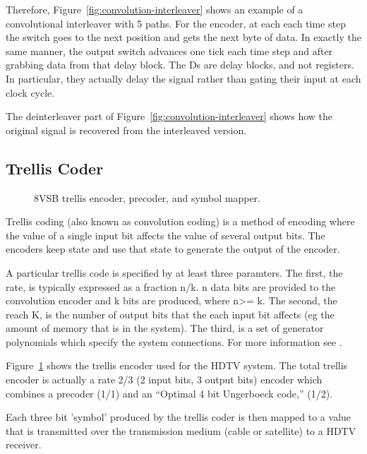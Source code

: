 \documentclass{article}
\begin{document}
Therefore, Figure~\ref{fig:convolution-interleaver} shows an example of a convolutional
interleaver with 5 paths. For the encoder, at each each time step the switch goes to the
next position and gets the next byte of data. In exactly the same manner, the output
switch advances one tick each time step and after grabbing data from that delay block.
The Ds are delay blocks, and not registers. In particular, they actually delay the signal
rather than gating their input at each clock cycle.

The deinterleaver part of Figure~\ref{fig:convolution-interleaver} shows how the 
original signal is recovered from the interleaved version. 





\subsection{Trellis Coder}
\begin{figure}
\center
\epsfxsize=5.5in
\caption{8VSB trellis encoder, precoder, and symbol mapper.}
\label{fig:trellis-system}
\end{figure}

Trellis coding (also known as convolution coding) 
is a method of encoding where the value of a single input 
bit affects the value of several output bits. The encoders
keep state and use that state to generate the output of the 
encoder. 

A particular trellis code is 
specified by at least three paramters. The first, the rate, is typically expressed as
a fraction n/k. n data bits are provided to the convolution encoder and k bits are produced,
where n>= k. The second, the reach K, is the number of output bits that the
each input bit affects (eg the amount of memory that is in the system). 
The third, is a set of generator polynomials which specify the system connections.
For more information see \cite{fleming:tutorial}.

Figure~\ref{fig:trellis-system} shows the trellis encoder used for the HDTV system. 
The total trellis encoder is actually a rate 2/3 (2 input bits, 3 output bits) 
encoder which combines a precoder (1/1) and an ``Optimal 4 bit 
Ungerboeck code,'' (1/2).

Each three bit 'symbol' produced by the trellis coder is then mapped to a value
that is transmitted over the transmission medium (cable or satellite) to 
a HDTV receiver. 
\end{document}
